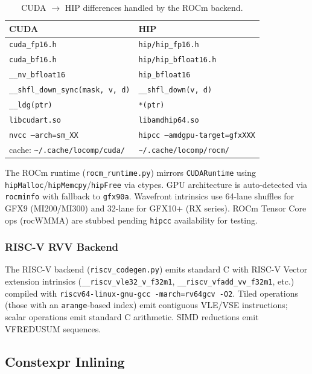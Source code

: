 \documentclass[10pt,twocolumn]{article}
\begin{document}
\begin{table}[h]
\centering
\footnotesize
\begin{tabular}{@{}ll@{}}
\toprule
\textbf{CUDA} & \textbf{HIP} \\
\midrule
\texttt{cuda\_fp16.h} & \texttt{hip/hip\_fp16.h} \\
\texttt{cuda\_bf16.h} & \texttt{hip/hip\_bfloat16.h} \\
\texttt{\_\_nv\_bfloat16} & \texttt{hip\_bfloat16} \\
\texttt{\_\_shfl\_down\_sync(mask, v, d)} & \texttt{\_\_shfl\_down(v, d)} \\
\texttt{\_\_ldg(ptr)} & \texttt{*(ptr)} \\
\texttt{libcudart.so} & \texttt{libamdhip64.so} \\
\texttt{nvcc --arch=sm\_XX} & \texttt{hipcc --amdgpu-target=gfxXXX} \\
cache: \texttt{\textasciitilde/.cache/locomp/cuda/} & \texttt{\textasciitilde/.cache/locomp/rocm/} \\
\bottomrule
\end{tabular}
\caption{CUDA $\to$ HIP differences handled by the ROCm backend.}
\label{tab:rocm-diff}
\end{table}

The ROCm runtime (\texttt{rocm\_runtime.py}) mirrors \texttt{CUDARuntime}
using \texttt{hipMalloc}/\texttt{hipMemcpy}/\texttt{hipFree} via ctypes.
GPU architecture is auto-detected via \texttt{rocminfo} with fallback to
\texttt{gfx90a}. Wavefront intrinsics use 64-lane shuffles for GFX9 (MI200/MI300)
and 32-lane for GFX10+ (RX series). ROCm Tensor Core ops (rocWMMA) are
stubbed pending \texttt{hipcc} availability for testing.

\subsubsection{RISC-V RVV Backend}

The RISC-V backend (\texttt{riscv\_codegen.py}) emits standard C with RISC-V
Vector extension intrinsics (\texttt{\_\_riscv\_vle32\_v\_f32m1},
\texttt{\_\_riscv\_vfadd\_vv\_f32m1}, etc.) compiled with
\texttt{riscv64-linux-gnu-gcc -march=rv64gcv -O2}. Tiled operations (those
with an \texttt{arange}-based index) emit contiguous VLE/VSE instructions;
scalar operations emit standard C arithmetic. SIMD reductions emit VFREDUSUM
sequences.

\subsection{Constexpr Inlining}
\end{document}
